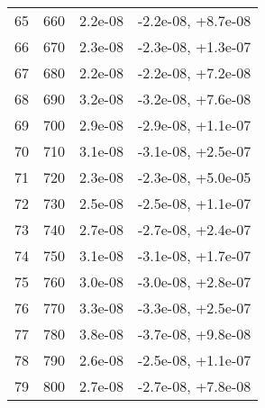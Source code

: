 \begin{table}
\begin{adjustbox}{width=1\textwidth/2}
\begin{tabular}{|c|c|c|c|}
\cline{1-4}
65 & 660 & 2.2e-08 & -2.2e-08, +8.7e-08 \\
\cline{1-4}
66 & 670 & 2.3e-08 & -2.3e-08, +1.3e-07 \\
\cline{1-4}
67 & 680 & 2.2e-08 & -2.2e-08, +7.2e-08 \\
\cline{1-4}
68 & 690 & 3.2e-08 & -3.2e-08, +7.6e-08 \\
\cline{1-4}
69 & 700 & 2.9e-08 & -2.9e-08, +1.1e-07 \\
\cline{1-4}
70 & 710 & 3.1e-08 & -3.1e-08, +2.5e-07 \\
\cline{1-4}
71 & 720 & 2.3e-08 & -2.3e-08, +5.0e-05 \\
\cline{1-4}
72 & 730 & 2.5e-08 & -2.5e-08, +1.1e-07 \\
\cline{1-4}
73 & 740 & 2.7e-08 & -2.7e-08, +2.4e-07 \\
\cline{1-4}
74 & 750 & 3.1e-08 & -3.1e-08, +1.7e-07 \\
\cline{1-4}
75 & 760 & 3.0e-08 & -3.0e-08, +2.8e-07 \\
\cline{1-4}
76 & 770 & 3.3e-08 & -3.3e-08, +2.5e-07 \\
\cline{1-4}
77 & 780 & 3.8e-08 & -3.7e-08, +9.8e-08 \\
\cline{1-4}
78 & 790 & 2.6e-08 & -2.5e-08, +1.1e-07 \\
\cline{1-4}
79 & 800 & 2.7e-08 & -2.7e-08, +7.8e-08 \\
\cline{1-4}
\end{tabular}
\end{adjustbox}
\end{table}

